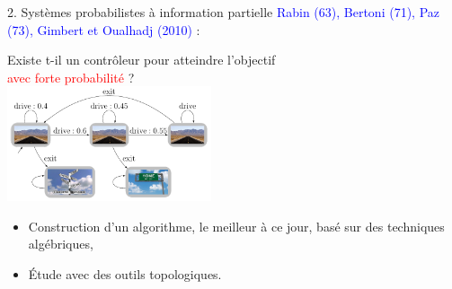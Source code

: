 \documentclass[svgnames]{beamer}
\begin{document}
\begin{frame}{2. Syst{\`e}mes probabilistes {\`a} information partielle}
\textcolor{blue}{Rabin (63), Bertoni (71), Paz (73), Gimbert et Oualhadj (2010)} :
\begin{center}
Existe t-il un contr{\^o}leur pour atteindre l'objectif \\
\textcolor{red}{avec forte probabilit{\'e}} ?\\

\includegraphics[width=6cm]{Fig/pa}
\end{center}


\begin{framed}
\begin{itemize}
	\item Construction d'un algorithme, le meilleur {\`a} ce jour, bas{\'e} sur des techniques alg{\'e}briques,
	\item {\'E}tude avec des outils topologiques.
\end{itemize}
\end{framed}

\end{frame}
\end{document}
